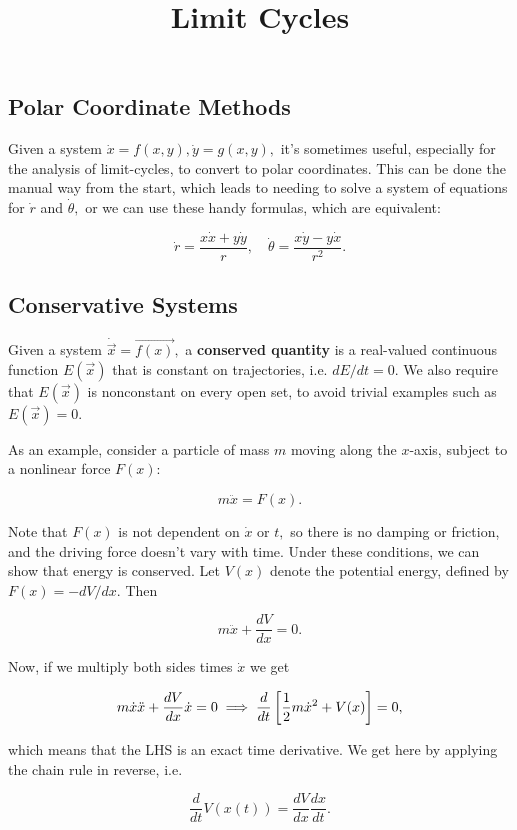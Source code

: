 \documentclass{article}
\title{Limit Cycles}
\begin{document}
\subsection{Polar Coordinate Methods}

Given a system $\dot{x} = f(x,y), \dot{y} = g(x,y),$ it's sometimes useful, especially for the analysis of \@{limit-cycles}, to convert to polar coordinates. This can be done the manual way from the start, which leads to needing to solve a system of equations for $\dot{r}$ and $\dot{\theta},$ or we can use these handy formulas, which are equivalent:

\[ \dot{r} = \frac{x \dot{x} + y \dot{y}}{r}, \quad \dot{\theta} = \frac{x \dot{y} - y \dot{x}}{r^2}. \]

\subsection{Conservative Systems}

\begin{definition}
Given a system $\dot{\vec{x}} = \vec{f(x)},$ a \textbf{conserved quantity} is a \@{real-valued} \@{continuous} \@{function} $E(\vec{x})$ that is constant on \@{trajectories}, i.e. $dE/dt = 0.$ We also require that $E(\vec{x})$ is nonconstant on every \@{open} set, to avoid trivial examples such as $E(\vec{x}) = 0.$
\end{definition}

As an example, consider a particle of mass $m$ moving along the $x$-axis, subject to a nonlinear force $F(x):$

\[ m\ddot{x} = F(x). \]

Note that $F(x)$ is not dependent on $\dot{x}$ or $t,$ so there is no damping or friction, and the driving force doesn't vary with time. Under these conditions, we can show that energy is conserved. Let $V(x)$ denote the potential energy, defined by $F(x) = -dV/dx.$ Then

\[ m\ddot{x} + \frac{dV}{dx}  = 0. \]

Now, if we multiply both sides times $\dot{x}$ we get

\[ m \dot{x} \ddot{x} + \frac{dV}{dx} \dot{x} = 0 \implies \frac{d}{dt} \left[\frac{1}{2} m \dot{x}^2 + V(x)\right] = 0, \]

which means that the LHS is an \@{exact} time derivative. We get here by applying the chain rule in reverse, i.e.

\[ \frac{d}{dt} V(x(t)) = \frac{dV}{dx} \frac{dx}{dt}. \]
\end{document}
